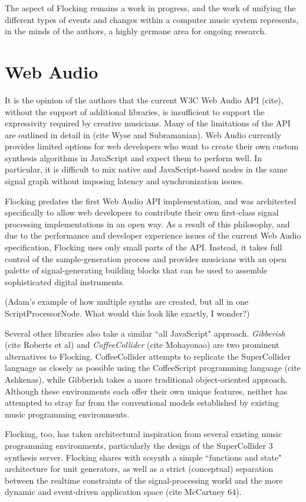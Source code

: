 \documentclass{article}
\begin{document}
The aspect of Flocking remains a work in progress, and the work of unifying the different types of events and changes within a computer music system represents, in the minds of the authors, a highly germane area for ongoing research.

\section{Web Audio}

It is the opinion of the authors that the current W3C Web Audio API (cite), without the support of additional libraries, is insufficient to support the expressivity required by creative musicians. Many of the limitations of the API are outlined in detail in (cite Wyse and Subramanian). Web Audio currently provides limited options for web developers who want to create their own custom synthesis algorithms in JavaScript and expect them to perform well. In particular, it is difficult to mix native and JavaScript-based nodes in the same signal graph without imposing latency and synchronization issues.

Flocking predates the first Web Audio API implementation, and was architected specifically to allow web developers to contribute their own first-class signal processing implementations in an open way. As a result of this philosophy, and due to the performance and developer experience issues of the current Web Audio specification, Flocking uses only small parts of the API. Instead, it takes full control of the sample-generation process and provides musicians with an open palette of signal-generating building blocks that can be used to assemble sophisticated digital instruments.

(Adam's example of how multiple synths are created, but all in one ScriptProcessorNode. What would this look like exactly, I wonder?)

Several other libraries also take a similar ``all JavaScript" approach. {\it Gibberish} (cite Roberts et al) and {\it CoffeeCollider} (cite Mohayonao) are two prominent alternatives to Flocking. CoffeeCollider attempts to replicate the SuperCollider language as closely as possible using the CoffeeScript programming language (cite Ashkenas), while Gibberish takes a more traditional object-oriented approach. Although these environments each offer their own unique features, neither has attempted to stray far from the conventional models established by existing music programming environments.

Flocking, too, has taken architectural inspiration from several existing music programming environments, particularly the design of the SuperCollider 3 synthesis server. Flocking shares with scsynth a simple ``functions and state" architecture for unit generators, as well as a strict (conceptual) separation between the realtime constraints of the signal-processing world and the more dynamic and event-driven application space (cite McCartney 64).
\end{document}

